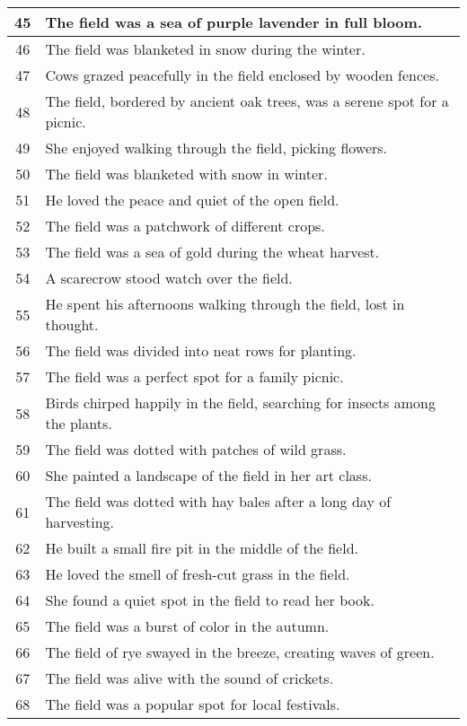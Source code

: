\begin{longtable}{|c|p{12cm}|}
45 & The field was a sea of purple lavender in full bloom. \\ \hline
46 & The field was blanketed in snow during the winter. \\ \hline
47 & Cows grazed peacefully in the field enclosed by wooden fences. \\ \hline
48 & The field, bordered by ancient oak trees, was a serene spot for a picnic. \\ \hline
49 & She enjoyed walking through the field, picking flowers. \\ \hline
50 & The field was blanketed with snow in winter. \\ \hline
51 & He loved the peace and quiet of the open field. \\ \hline
52 & The field was a patchwork of different crops. \\ \hline
53 & The field was a sea of gold during the wheat harvest. \\ \hline
54 & A scarecrow stood watch over the field. \\ \hline
55 & He spent his afternoons walking through the field, lost in thought. \\ \hline
56 & The field was divided into neat rows for planting. \\ \hline
57 & The field was a perfect spot for a family picnic. \\ \hline
58 & Birds chirped happily in the field, searching for insects among the plants. \\ \hline
59 & The field was dotted with patches of wild grass. \\ \hline
60 & She painted a landscape of the field in her art class. \\ \hline
61 & The field was dotted with hay bales after a long day of harvesting. \\ \hline
62 & He built a small fire pit in the middle of the field. \\ \hline
63 & He loved the smell of fresh-cut grass in the field. \\ \hline
64 & She found a quiet spot in the field to read her book. \\ \hline
65 & The field was a burst of color in the autumn. \\ \hline
66 & The field of rye swayed in the breeze, creating waves of green. \\ \hline
67 & The field was alive with the sound of crickets. \\ \hline
68 & The field was a popular spot for local festivals. \\ \hline

\end{longtable}
